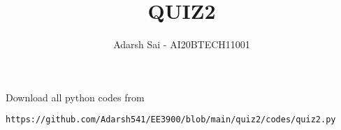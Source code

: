 \documentclass[journal,12pt,twocolumn]{IEEEtran}
\DeclareMathOperator*{\Res}{Res}
\begin{document}
\newcommand{\BEQA}{\begin{eqnarray}}
\newcommand{\EEQA}{\end{eqnarray}}
\newcommand{\define}{\stackrel{\triangle}{=}}

\raggedbottom
\setlength{\parindent}{0pt}
\providecommand{\mbf}{\mathbf}
\providecommand{\pr}[1]{\ensuremath{\Pr\left(#1\right)}}
\providecommand{\qfunc}[1]{\ensuremath{Q\left(#1\right)}}
\providecommand{\sbrak}[1]{\ensuremath{{}\left[#1\right]}}
\providecommand{\lsbrak}[1]{\ensuremath{{}\left[#1\right.}}
\providecommand{\rsbrak}[1]{\ensuremath{{}\left.#1\right]}}
\providecommand{\brak}[1]{\ensuremath{\left(#1\right)}}
\providecommand{\lbrak}[1]{\ensuremath{\left(#1\right.}}
\providecommand{\rbrak}[1]{\ensuremath{\left.#1\right)}}
\providecommand{\cbrak}[1]{\ensuremath{\left\{#1\right\}}}
\providecommand{\lcbrak}[1]{\ensuremath{\left\{#1\right.}}
\providecommand{\rcbrak}[1]{\ensuremath{\left.#1\right\}}}
\theoremstyle{remark}
\newtheorem{rem}{Remark}
\newcommand{\sgn}{\mathop{\mathrm{sgn}}}
\providecommand{\abs}[1]{\vert#1\vert}
\providecommand{\res}[1]{\Res\displaylimits_{#1}} 
\providecommand{\norm}[1]{\lVert#1\rVert}
\providecommand{\mtx}[1]{\mathbf{#1}}
\providecommand{\mean}[1]{E[ #1 ]}
\providecommand{\fourier}{\overset{\mathcal{F}}{ \rightleftharpoons}}
\providecommand{\zee}{\overset{\mathcal{Z}}{ \rightleftharpoons}}
\providecommand{\system}{\overset{\mathcal{H}}{ \longleftrightarrow}}
\newcommand{\solution}{\noindent \textbf{Solution: }}
\newcommand{\cosec}{\,\text{cosec}\,}
\providecommand{\dec}[2]{\ensuremath{\overset{#1}{\underset{#2}{\gtrless}}}}
\newcommand{\myvec}[1]{\ensuremath{\begin{pmatrix}#1\end{pmatrix}}}
\newcommand{\mydet}[1]{\ensuremath{\begin{vmatrix}#1\end{vmatrix}}}
\makeatletter
{}
\makeatother
\let\StandardTheFigure\thefigure
\let\vec\mathbf
\renewcommand{\thefigure}{\theproblem}
\def\putbox#1#2#3{\makebox[0in][l]{\makebox[#1][l]{}\raisebox{\baselineskip}[0in][0in]{\raisebox{#2}[0in][0in]{#3}}}}
     \def\rightbox#1{\makebox[0in][r]{#1}}
     \def\centbox#1{\makebox[0in]{#1}}
     \def\topbox#1{\raisebox{-\baselineskip}[0in][0in]{#1}}
     \def\midbox#1{\raisebox{-0.5\baselineskip}[0in][0in]{#1}}
\vspace{3cm}
\title{QUIZ2}
\author{Adarsh Sai - AI20BTECH11001}
\maketitle
\newpage
\bigskip
\renewcommand{\thefigure}{\theenumi}
\renewcommand{\thetable}{\theenumi}
Download all python codes from 
\begin{lstlisting}
https://github.com/Adarsh541/EE3900/blob/main/quiz2/codes/quiz2.py
\end{lstlisting}
\end{document}
